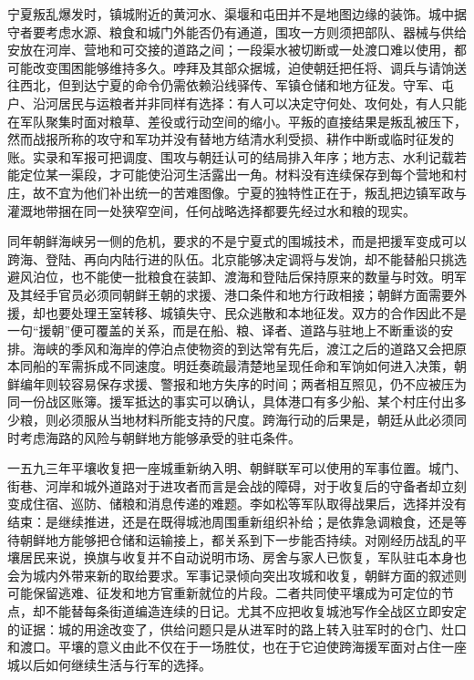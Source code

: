 宁夏叛乱爆发时，镇城附近的黄河水、渠堰和屯田并不是地图边缘的装饰。城中据守者要考虑水源、粮食和城门外能否仍有通道，围攻一方则须把部队、器械与供给安放在河岸、营地和可交接的道路之间；一段渠水被切断或一处渡口难以使用，都可能改变围困能够维持多久。哱拜及其部众据城，迫使朝廷把任将、调兵与请饷送往西北，但到达宁夏的命令仍需依赖沿线驿传、军镇仓储和地方征发。守军、屯户、沿河居民与运粮者并非同样有选择：有人可以决定守何处、攻何处，有人只能在军队聚集时面对粮草、差役或行动空间的缩小。平叛的直接结果是叛乱被压下，然而战报所称的攻守和军功并没有替地方结清水利受损、耕作中断或临时征发的账。实录和军报可把调度、围攻与朝廷认可的结局排入年序；地方志、水利记载若能定位某一渠段，才可能使沿河生活露出一角。材料没有连续保存到每个营地和村庄，故不宜为他们补出统一的苦难图像。宁夏的独特性正在于，叛乱把边镇军政与灌溉地带捆在同一处狭窄空间，任何战略选择都要先经过水和粮的现实。

同年朝鲜海峡另一侧的危机，要求的不是宁夏式的围城技术，而是把援军变成可以跨海、登陆、再向内陆行进的队伍。北京能够决定调将与发饷，却不能替船只挑选避风泊位，也不能使一批粮食在装卸、渡海和登陆后保持原来的数量与时效。明军及其经手官员必须同朝鲜王朝的求援、港口条件和地方行政相接；朝鲜方面需要外援，却也要处理王室转移、城镇失守、民众逃散和本地征发。双方的合作因此不是一句“援朝”便可覆盖的关系，而是在船、粮、译者、道路与驻地上不断重谈的安排。海峡的季风和海岸的停泊点使物资的到达常有先后，渡江之后的道路又会把原本同船的军需拆成不同速度。明廷奏疏最清楚地呈现任命和军饷如何进入决策，朝鲜编年则较容易保存求援、警报和地方失序的时间；两者相互照见，仍不应被压为同一份战区账簿。援军抵达的事实可以确认，具体港口有多少船、某个村庄付出多少粮，则必须服从当地材料所能支持的尺度。跨海行动的后果是，朝廷从此必须同时考虑海路的风险与朝鲜地方能够承受的驻屯条件。

一五九三年平壤收复把一座城重新纳入明、朝鲜联军可以使用的军事位置。城门、街巷、河岸和城外道路对于进攻者而言是会战的障碍，对于收复后的守备者却立刻变成住宿、巡防、储粮和消息传递的难题。李如松等军队取得战果后，选择并没有结束：是继续推进，还是在既得城池周围重新组织补给；是依靠急调粮食，还是等待朝鲜地方能够把仓储和运输接上，都关系到下一步能否持续。对刚经历战乱的平壤居民来说，换旗与收复并不自动说明市场、房舍与家人已恢复，军队驻屯本身也会为城内外带来新的取给要求。军事记录倾向突出攻城和收复，朝鲜方面的叙述则可能保留逃难、征发和地方官重新就位的片段。二者共同使平壤成为可定位的节点，却不能替每条街道编造连续的日记。尤其不应把收复城池写作全战区立即安定的证据：城的用途改变了，供给问题只是从进军时的路上转入驻军时的仓门、灶口和渡口。平壤的意义由此不仅在于一场胜仗，也在于它迫使跨海援军面对占住一座城以后如何继续生活与行军的选择。

